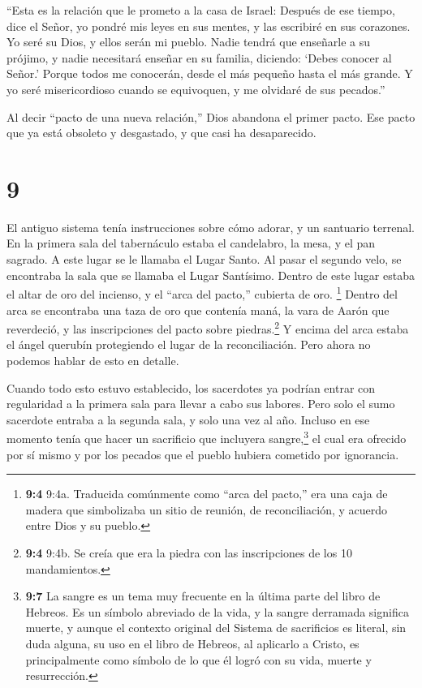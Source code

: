  ``Esta es la relación que le prometo a la casa de Israel:
Después de ese tiempo, dice el Señor, yo pondré mis leyes en sus mentes,
y las escribiré en sus corazones. Yo seré su Dios, y ellos serán mi
pueblo.  Nadie tendrá que enseñarle a su prójimo, y nadie
necesitará enseñar en su familia, diciendo: `Debes conocer al Señor.'
Porque todos me conocerán, desde el más pequeño hasta el más grande.
 Y yo seré misericordioso cuando se equivoquen, y me
olvidaré de sus pecados.''

 Al decir ``pacto de una nueva relación,'' Dios abandona el
primer pacto. Ese pacto que ya está obsoleto y desgastado, y que casi ha
desaparecido.

\hypertarget{section-8}{%
\section{9}\label{section-8}}

 El antiguo sistema tenía instrucciones sobre cómo adorar, y
un santuario terrenal.  En la primera sala del tabernáculo
estaba el candelabro, la mesa, y el pan sagrado. A este lugar se le
llamaba el Lugar Santo.  Al pasar el segundo velo, se
encontraba la sala que se llamaba el Lugar Santísimo. 
Dentro de este lugar estaba el altar de oro del incienso, y el ``arca
del pacto,'' cubierta de oro. \footnote{\textbf{9:4} 9:4a. Traducida
  comúnmente como ``arca del pacto,'' era una caja de madera que
  simbolizaba un sitio de reunión, de reconciliación, y acuerdo entre
  Dios y su pueblo.} Dentro del arca se encontraba una taza de oro que
contenía maná, la vara de Aarón que reverdeció, y las inscripciones del
pacto sobre piedras.\footnote{\textbf{9:4} 9:4b. Se creía que era la
  piedra con las inscripciones de los 10 mandamientos.}  Y
encima del arca estaba el ángel querubín protegiendo el lugar de la
reconciliación. Pero ahora no podemos hablar de esto en detalle.

 Cuando todo esto estuvo establecido, los sacerdotes ya
podrían entrar con regularidad a la primera sala para llevar a cabo sus
labores.  Pero solo el sumo sacerdote entraba a la segunda
sala, y solo una vez al año. Incluso en ese momento tenía que hacer un
sacrificio que incluyera sangre,\footnote{\textbf{9:7} La sangre es un
  tema muy frecuente en la última parte del libro de Hebreos. Es un
  símbolo abreviado de la vida, y la sangre derramada significa muerte,
  y aunque el contexto original del Sistema de sacrificios es literal,
  sin duda alguna, su uso en el libro de Hebreos, al aplicarlo a Cristo,
  es principalmente como símbolo de lo que él logró con su vida, muerte
  y resurrección.} el cual era ofrecido por sí mismo y por los pecados
que el pueblo hubiera cometido por ignorancia.

